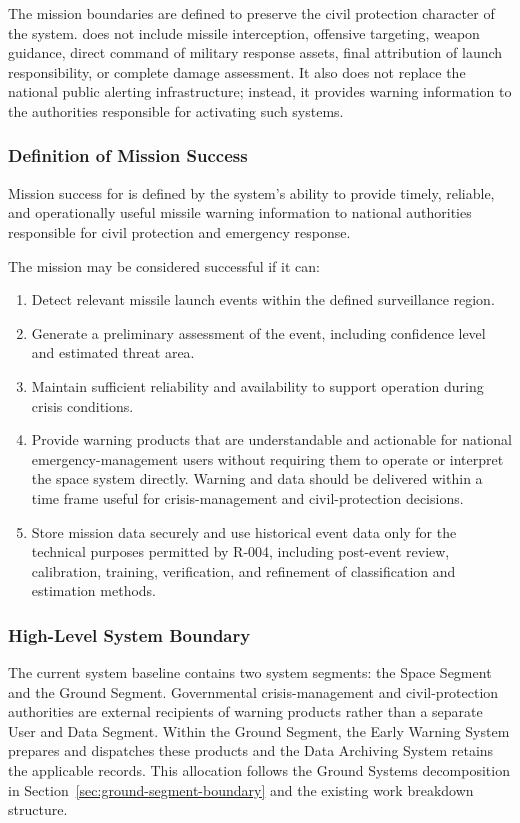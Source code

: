 The mission boundaries are defined to preserve the civil protection character of the system.  does not include missile interception, offensive targeting, weapon guidance, direct command of military response assets, final attribution of launch responsibility, or complete damage assessment. It also does not replace the national public alerting infrastructure; instead, it provides warning information to the authorities responsible for activating such systems.

\subsubsection{Definition of Mission Success}

Mission success for  is defined by the system's ability to provide timely, reliable, and operationally useful missile warning information to national authorities responsible for civil protection and emergency response.

The mission may be considered successful if it can:

\begin{enumerate}
    \item Detect relevant missile launch events within the defined surveillance region.
    \item Generate a preliminary assessment of the event, including confidence level and estimated threat area.
    \item Maintain sufficient reliability and availability to support operation during crisis conditions.
    \item Provide warning products that are understandable and actionable for national emergency-management users without requiring them to operate or interpret the space system directly. Warning and data should be delivered within a time frame useful for crisis-management and civil-protection decisions.
    \item Store mission data securely and use historical event data only for the technical purposes permitted by R-004, including post-event review, calibration, training, verification, and refinement of classification and estimation methods.
\end{enumerate}

\subsubsection{High-Level System Boundary}
The current system baseline contains two system segments: the Space Segment and the Ground Segment. Governmental crisis-management and civil-protection authorities are external recipients of warning products rather than a separate User and Data Segment. Within the Ground Segment, the Early Warning System prepares and dispatches these products and the Data Archiving System retains the applicable records. This allocation follows the Ground Systems decomposition in Section~\ref{sec:ground-segment-boundary} and the existing work breakdown structure.

